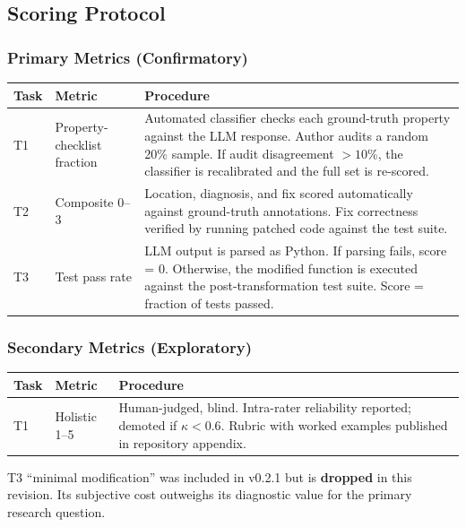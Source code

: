 \documentclass[11pt]{article}
\begin{document}
\subsection{Scoring Protocol}

\subsubsection*{Primary Metrics (Confirmatory)}

\begin{longtable}{@{}llp{7cm}@{}}
  \toprule
  \textbf{Task} & \textbf{Metric} & \textbf{Procedure} \\
  \midrule
  \endfirsthead
  T1 &
    Property-checklist fraction &
    Automated classifier checks each ground-truth property against the
    LLM response.  Author audits a random 20\% sample.  If audit
    disagreement $> 10\%$, the classifier is recalibrated and the
    full set is re-scored. \\
  \addlinespace
  T2 &
    Composite 0--3 &
    Location, diagnosis, and fix scored automatically against
    ground-truth annotations.  Fix correctness verified by running
    patched code against the test suite. \\
  \addlinespace
  T3 &
    Test pass rate &
    LLM output is parsed as Python.  If parsing fails, score = 0.
    Otherwise, the modified function is executed against the
    post-transformation test suite.  Score = fraction of tests
    passed. \\
  \bottomrule
\end{longtable}

\subsubsection*{Secondary Metrics (Exploratory)}

\begin{longtable}{@{}llp{7cm}@{}}
  \toprule
  \textbf{Task} & \textbf{Metric} & \textbf{Procedure} \\
  \midrule
  \endfirsthead
  T1 &
    Holistic 1--5 &
    Human-judged, blind.  Intra-rater reliability reported; demoted
    if $\kappa < 0.6$.  Rubric with worked examples published in
    repository appendix. \\
  \bottomrule
\end{longtable}

\noindent T3 ``minimal modification'' was included in v0.2.1 but is
\textbf{dropped} in this revision.  Its subjective cost outweighs its
diagnostic value for the primary research question.
\end{document}
